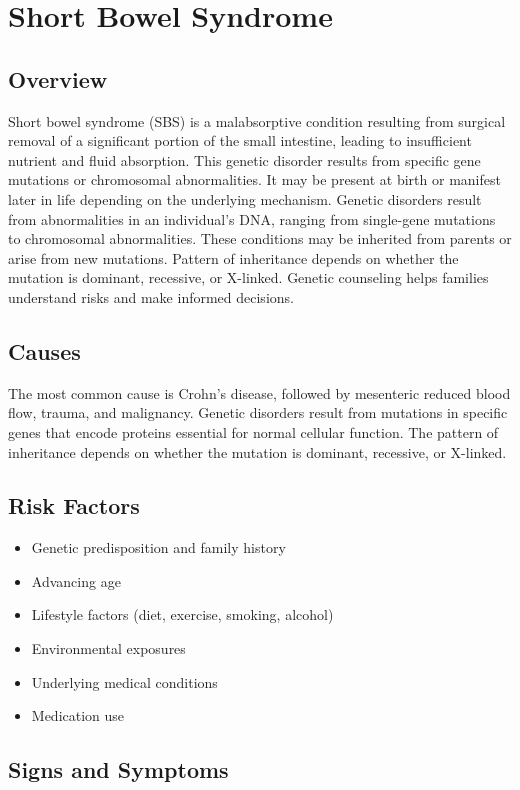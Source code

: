 \chapter{Short Bowel Syndrome}
\label{sec:Short Bowel Syndrome}

\section{Overview}
Short bowel syndrome (SBS) is a malabsorptive condition resulting from surgical removal of a significant portion of the small intestine, leading to insufficient nutrient and fluid absorption. This genetic disorder results from specific gene mutations or chromosomal abnormalities. It may be present at birth or manifest later in life depending on the underlying mechanism. Genetic disorders result from abnormalities in an individual's DNA, ranging from single-gene mutations to chromosomal abnormalities. These conditions may be inherited from parents or arise from new mutations. Pattern of inheritance depends on whether the mutation is dominant, recessive, or X-linked. Genetic counseling helps families understand risks and make informed decisions.
\section{Causes}
The most common cause is Crohn's disease, followed by mesenteric reduced blood flow, trauma, and malignancy. Genetic disorders result from mutations in specific genes that encode proteins essential for normal cellular function. The pattern of inheritance depends on whether the mutation is dominant, recessive, or X-linked.   
\section{Risk Factors}

\begin{itemize}[noitemsep]
  \item Genetic predisposition and family history
  \item Advancing age
  \item Lifestyle factors (diet, exercise, smoking, alcohol)
  \item Environmental exposures
  \item Underlying medical conditions
  \item Medication use
\end{itemize}
\section{Signs and Symptoms}

